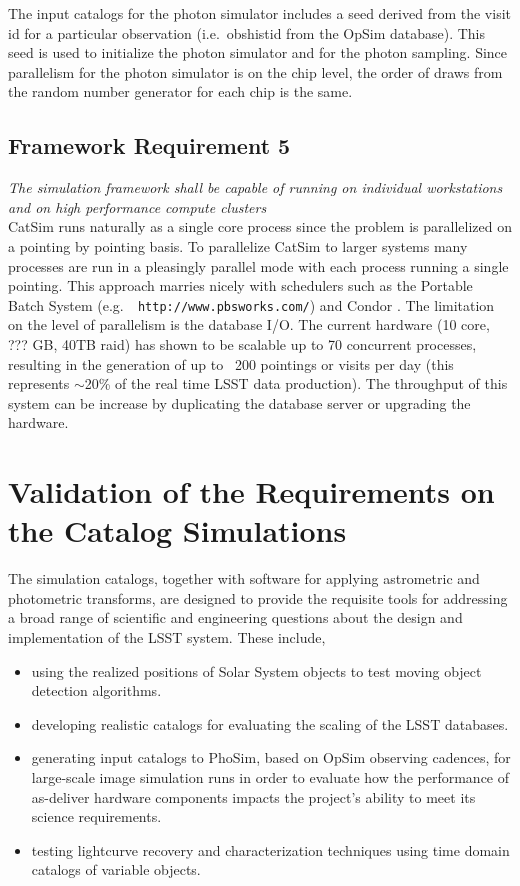 \documentclass[]{article}
\begin{document}
The input catalogs for the photon simulator includes a seed derived
from the visit id for a particular observation (i.e.\ obshistid from
the OpSim database). This seed is used to initialize the photon
simulator and for the photon sampling. Since parallelism for the
photon simulator is on the chip level, the order of draws from the
random number generator for each chip is the same.


\subsection{Framework Requirement 5}

{\it The simulation framework shall be capable of running on individual workstations 
and on high performance compute clusters}\\


CatSim runs naturally as a single core process since the problem is
parallelized on a pointing by pointing basis.  To parallelize CatSim
to larger systems many processes are run in a pleasingly parallel mode
with each process running a single pointing.  This approach marries
nicely with schedulers such as the Portable Batch System (e.g.\ {\tt
  http://www.pbsworks.com/}) and Condor \citep{condor}.  The
limitation on the level of parallelism is the database I/O.  The
current hardware (10 core, ??? GB, 40TB raid) has shown to be scalable
up to 70 concurrent processes, resulting in the generation of up to
~200 pointings or visits per day (this represents $\sim$20\% of the
real time LSST data production).  The throughput of this system can be
increase by duplicating the database server or upgrading the hardware.

\section{Validation of the Requirements on the Catalog Simulations}

The simulation catalogs, together with software for applying
astrometric and photometric transforms, are designed to provide the
requisite tools for addressing a broad range of scientific and
engineering questions about the design and implementation of the LSST
system. These include,
\begin{itemize}
\item using the realized positions of Solar System objects to
  test moving object detection algorithms.
\item developing realistic  catalogs for evaluating the scaling of the LSST databases.
\item generating input catalogs to PhoSim, based on OpSim observing
  cadences, for large-scale image simulation runs in order to evaluate
  how the performance of as-deliver hardware components impacts the
  project's ability to meet its science requirements.
\item testing lightcurve recovery and characterization techniques
  using time domain catalogs of variable objects.
\end{itemize}
\end{document}
